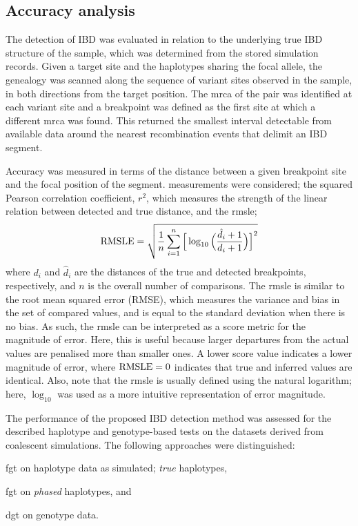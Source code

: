 %
\subsection{Accuracy analysis}
\label{sec:ibd_analysis}
%

The detection of IBD was evaluated in relation to the underlying true IBD structure of the sample, which was determined from the stored simulation records.
Given a target site and the  haplotypes sharing the focal allele, the genealogy was scanned along the sequence of variant sites observed in the sample, in both directions from the target position.
The \gls{mrca} of the pair was identified at each variant site and a breakpoint was defined as the first site at which a different \gls{mrca} was found.
This returned the smallest interval detectable from available data around the nearest recombination events that delimit an IBD segment.

Accuracy was measured in terms of the  distance between a given breakpoint site and the focal position of the segment.
 measurements were considered; the squared Pearson correlation coefficient, $r^2$, which measures the strength of the linear relation between detected and true distance, and the \gls{rmsle};
\begin{equation}\label{eq:rmsle}
	\operatorname*{RMSLE} = \sqrt{ \frac{1}{n} \sum_{i=1}^n \Big[\log_{10}\Big(\frac{\hat{d}_i + 1}{d_i + 1}\Big)\Big]^2 }
\end{equation}
where $d_i$ and $\hat{d}_i$ are the distances of the true and detected breakpoints, respectively, and $n$ is the overall number of comparisons.
The \gls{rmsle} is similar to the root mean squared error (RMSE), which measures the variance and bias in the set of compared values, and is equal to the standard deviation when there is no bias.
As such, the \gls{rmsle} can be interpreted as a score metric for the magnitude of error.
Here, this is useful because larger departures from the actual values are penalised more than smaller ones.
A lower score value indicates a lower magnitude of error, where ${\operatorname*{RMSLE} = 0}$ indicates that true and inferred values are identical.
Also, note that the \gls{rmsle} is usually defined using the natural logarithm; here, $\log_{10}$ was used as a more intuitive representation of error magnitude.



The performance of the proposed IBD detection method was assessed for the described haplotype and genotype-based tests on the  datasets derived from coalescent simulations.
The following approaches were distinguished:
\begin{approach}\setlength\itemsep{0em}
\item\label{app:fgt_h} \gls{fgt} on haplotype data as simulated; \ie \emph{true} haplotypes,
\item\label{app:fgt_p} \gls{fgt} on \emph{phased} haplotypes, and
\item\label{app:dgt} \gls{dgt} on genotype data.
\end{approach}


